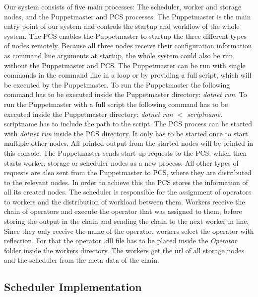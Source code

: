 \documentclass[times, 10pt,twocolumn]{article}
\begin{document}
Our system consists of five main processes: The scheduler, worker and storage nodes, and the Puppetmaster and PCS processes.
The Puppetmaster is the main entry point of our system and controls the startup and workflow of the whole system.
The PCS enables the Puppetmaster to startup the three different types of nodes remotely.
Because all three nodes receive their configuration information as command line arguments at startup, the whole system could also be run without the Puppetmaster and PCS.
The Puppetmaster can be run with single commands in the command line in a loop or by providing a full script, which will be executed by the Puppetmaster. \newline
To run the Puppetmaster the following command has to be executed inside the Puppetmaster directory:
\emph{dotnet run}. \newline
To run the Puppetmaster with a full script the following command has to be executed inside the Puppetmaster directory: 
\emph{dotnet run $<$ scriptname}.
scriptname has to include the path to the script. \newline
The PCS process can be started with \emph{dotnet run} inside the PCS directory.
It only has to be started once to start multiple other nodes.
All printed output from the started nodes will be printed in this console.
The Puppetmaster sends start up requests to the PCS, which then starts worker, storage or scheduler nodes as a new process.
All other types of requests are also sent from the Puppetmaster to PCS, where they are distributed to the relevant nodes. 
In order to achieve this the PCS stores the information of all its created nodes. \newline
The scheduler is responsible for the assignment of operators to workers and the distribution of workload between them.
Workers receive the chain of operators and execute the operator that was assigned to them, before storing the output in the chain and sending the chain to the next worker in line.
Since they only receive the name of the operator, workers select the operator with reflection.
For that the operator .dll file has to be placed inside the \emph{Operator} folder inside the workers directory.
The workers get the url of all storage nodes and the scheduler from the meta data of the chain.
\newline


\subsection{Scheduler Implementation}
\end{document}
